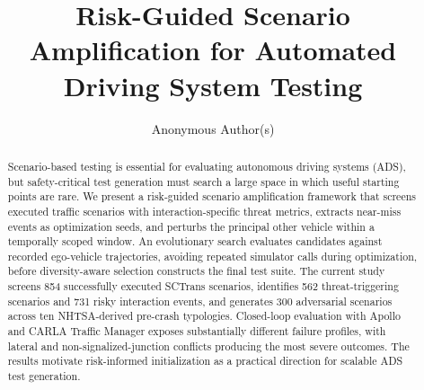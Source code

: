 \documentclass[sigconf,review,anonymous]{acmart}
\title{Risk-Guided Scenario Amplification for Automated Driving System Testing}
\author{Anonymous Author(s)}
\affiliation{%
  \institution{Anonymous Institution}
  \country{Anonymous}
}
\begin{document}
\begin{abstract}
Scenario-based testing is essential for evaluating autonomous driving systems (ADS), but safety-critical test generation must search a large space in which useful starting points are rare. We present a risk-guided scenario amplification framework that screens executed traffic scenarios with interaction-specific threat metrics, extracts near-miss events as optimization seeds, and perturbs the principal other vehicle within a temporally scoped window. An evolutionary search evaluates candidates against recorded ego-vehicle trajectories, avoiding repeated simulator calls during optimization, before diversity-aware selection constructs the final test suite. The current study screens 854 successfully executed SCTrans scenarios, identifies 562 threat-triggering scenarios and 731 risky interaction events, and generates 300 adversarial scenarios across ten NHTSA-derived pre-crash typologies. Closed-loop evaluation with Apollo and CARLA Traffic Manager exposes substantially different failure profiles, with lateral and non-signalized-junction conflicts producing the most severe outcomes. The results motivate risk-informed initialization as a practical direction for scalable ADS test generation.
\end{abstract}


\maketitle












\end{document}
